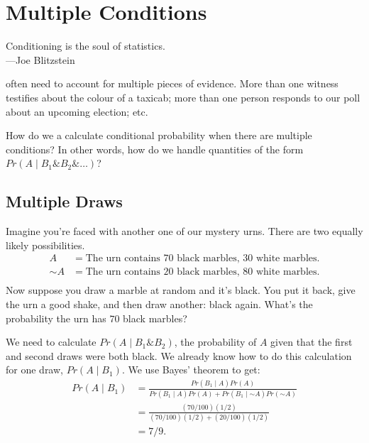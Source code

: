 \documentclass[justified]{tufte-book}
\newcommand{\given}{\mid}
\renewcommand{\neg}{\mathbin{\sim}}
\renewcommand{\wedge}{\mathbin{\&}}
\newcommand{\p}{Pr}
\newenvironment{epigraph}%
{
\begin{flushright}    
\begin{minipage}{20em}
\begin{flushright}
\itshape
}%
{
\end{flushright}
\end{minipage}
\end{flushright}
}
\theoremstyle{definition}
\theoremstyle{definition}
\theoremstyle{definition}
\theoremstyle{definition}
\theoremstyle{remark}
\begin{document}
\hypertarget{multiple-conditions}{%
\chapter{Multiple Conditions}\label{multiple-conditions}}

\begin{epigraph}
Conditioning is the soul of statistics.\\
---Joe Blitzstein
\end{epigraph}

 often need to account for multiple pieces of evidence. More than one witness testifies about the colour of a taxicab; more than one person responds to our poll about an upcoming election; etc.

How do we a calculate conditional probability when there are multiple conditions? In other words, how do we handle quantities of the form \(\p(A \given B_1 \wedge B_2 \wedge \ldots)\)?

\hypertarget{multiple-draws}{%
\section{Multiple Draws}\label{multiple-draws}}

Imagine you're faced with another one of our mystery urns. There are two equally likely possibilities.
\[
  \begin{aligned}
    A      &= \mbox{The urn contains $70$ black marbles, $30$ white marbles.}\\
    \neg A &= \mbox{The urn contains $20$ black marbles, $80$ white marbles.}\\
  \end{aligned}
\]
Now suppose you draw a marble at random and it's black. You put it back, give the urn a good shake, and then draw another: black again. What's the probability the urn has \(70\) black marbles?

We need to calculate \(\p(A \given B_1 \wedge B_2)\), the probability of \(A\) given that the first and second draws were both black. We already know how to do this calculation for one draw, \(\p(A \given B_1)\). We use Bayes' theorem to get:
\[
  \begin{aligned}
    \p(A \given B_1) &= \frac{\p(B_1 \given A)\p(A)}{\p(B_1 \given A) \p(A) + \p(B_1 \given \neg A) \p(\neg A)} \\
      &= \frac{(70/100)(1/2)}{(70/100)(1/2) + (20/100)(1/2)}\\
      &= 7/9.
  \end{aligned}
\]
\end{document}
